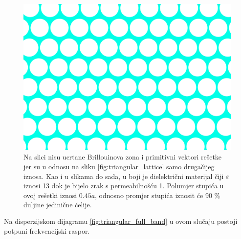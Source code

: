 \documentclass[utf8, seminar]{fer}
\begin{document}
\begin{figure}[ht]
	\centering
	\includegraphics[width = 1.0\linewidth]{./images/triangular_lattice_holes.pdf}
	\caption{Na slici nisu ucrtane Brillouinova zona i primitivni vektori rešetke
	jer su u odnosu na sliku \ref{fig:triangular_lattice} samo drugačijeg iznosa.
	Kao i u slikama do sada, u boji je dielektrični materijal čiji $\varepsilon$
	iznosi 13 dok je bijelo zrak s permeabilnošću 1. Polumjer stupića u ovoj
	rešetki iznosi ${0.45 a}$, odnosno promjer stupića iznosit će 90 \% duljine
	jedinične ćelije.}
	\label{fig:triangular_lattice_holes}
\end{figure}

Na disperzijskom dijagramu \ref{fig:triangular_full_band} u ovom slučaju postoji
potpuni frekvencijski raspor.
\end{document}
